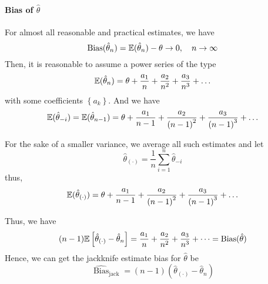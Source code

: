 \paragraph{Bias of \(\hat{\theta}\)}

For almost all reasonable and practical estimates, we have
\begin{equation*}
	\operatorname{Bias}(\hat{\theta}_{n})=\mathbb{E}(\hat{\theta}_{n})-\theta\rightarrow 0,\quad n\rightarrow\infty
\end{equation*}
Then, it is reasonable to assume a power series of the type
\begin{equation*}
	\mathbb{E}(\hat{\theta}_{n})=\theta+\frac{a_{1}}{n}+\frac{a_{2}}{n^{2}}+\frac{a_{3}}{n^{3}}+\ldots
\end{equation*}
with some coefficients \(\left\{a_{k}\right\}\). And we have
\begin{equation*}
	\mathbb{E}(\hat{\theta}_{-i})=\mathbb{E}(\hat{\theta}_{n-1})=\theta+\frac{a_{1}}{n-1}+\frac{a_{2}}{\left(n-1\right)^{2}}+\frac{a_{3}}{\left(n-1\right)^{3}}+\ldots
\end{equation*}

For the sake of a smaller variance, we average all such estimates and let
\begin{equation*}
	\hat{\theta}_{(\cdot)}=\frac{1}{n}\sum_{i=1}^{n}\hat{\theta}_{-i}
\end{equation*}
thus,
\begin{equation*}
	\mathbb{E}(\hat{\theta}_{(\cdot)})=\theta+\frac{a_{1}}{n-1}+\frac{a_{2}}{\left(n-1\right)^{2}}+\frac{a_{3}}{\left(n-1\right)^{3}}+\ldots
\end{equation*}

Thus, we have
\begin{equation*}
	(n-1)\mathbb{E}\left[\hat{\theta}_{(\cdot)}-\hat{\theta}_{n}\right]=\frac{a_{1}}{n}+\frac{a_{2}}{n^{2}}+\frac{a_{3}}{n^{3}}+\cdots=\operatorname{Bias}(\hat{\theta})
\end{equation*}
Hence, we can get the jackknife estimate bias for \(\hat{\theta}\) be
\begin{equation}
	\widehat{\operatorname{Bias}}_{\text{jack}}=(n-1)\left(\hat{\theta}_{(\cdot)}-\hat{\theta}_{n}\right)
\end{equation}


